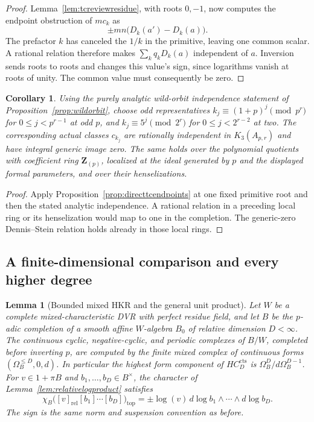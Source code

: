 \documentclass[11pt,a4paper]{article}
\newtheorem{lemma}[theorem]{Lemma}
\newtheorem{corollary}[theorem]{Corollary}
\theoremstyle{remark}
\begin{document}
\begin{proof}
Lemma~\ref{lem:tcreviewresidue}, with roots $0,-1$, now computes the
endpoint obstruction of $mc_k$ as
\[
          \pm mn\bigl(D_k(a')-D_k(a)\bigr).
\]
The prefactor $k$ has canceled the $1/k$ in the primitive, leaving
one common scalar. A rational relation therefore makes
$\sum_kq_kD_k(a)$ independent of $a$. Inversion sends roots to
roots and changes this value's sign, since logarithms vanish at
roots of unity. The common value must consequently be zero.
\end{proof}

\begin{corollary}\label{cor:directtcwildorbit}
Using the purely analytic wild-orbit independence statement of
Proposition~\ref{prop:wildorbit}, choose odd representatives
$k_j\equiv(1+p)^j\pmod{p^r}$ for $0\le j<p^{r-1}$ at odd $p$,
and $k_j\equiv5^j\pmod{2^r}$ for $0\le j<2^{r-2}$ at two.
The corresponding actual classes $c_{k_j}$ are rationally independent
in $K_3(A_{p,r})$ and have integral generic image zero.
The same holds over the polynomial quotients with coefficient ring
$\mathbf Z_{(p)}$, localized at the ideal generated by $p$ and the
displayed formal parameters, and over their henselizations.
\end{corollary}
\begin{proof}
Apply Proposition~\ref{prop:directtcendpoints} at one fixed primitive
root and then the stated analytic independence. A rational relation
in a preceding local ring or its henselization would map to one in
the completion. The generic-zero Dennis--Stein relation holds already
in those local rings.
\end{proof}



\subsection{A finite-dimensional comparison and every higher degree}
\label{sec:allhigherdegreelaurent}

\begin{lemma}[Bounded mixed HKR and the general unit product]
\label{lem:finitehkrgeneral}
Let $W$ be a complete mixed-characteristic DVR with perfect residue
field, and let $B$ be the $p$-adic completion of a smooth affine
$W$-algebra $B_0$ of relative dimension $D<\infty$.
The continuous cyclic, negative-cyclic, and periodic complexes of
$B/W$, completed before inverting $p$, are computed by the finite
mixed complex of continuous forms $(\Omega_B^{\leq D},0,d)$.
In particular the highest form component of $HC_D^{\mathrm{cts}}$
is $\Omega_B^D/d\Omega_B^{D-1}$.
For $v\in1+\pi B$ and $b_1,\ldots,b_D\in B^\times$, the character
of Lemma~\ref{lem:relativelogproduct} satisfies
\[
 \chi_B\bigl([v]_{\mathrm{rel}}[b_1]\cdots[b_D]\bigr)_{\mathrm{top}}
 =\pm\log(v)\,d\log b_1\wedge\cdots\wedge d\log b_D.
\]
The sign is the same norm and suspension convention as before.
\end{lemma}
\end{document}
